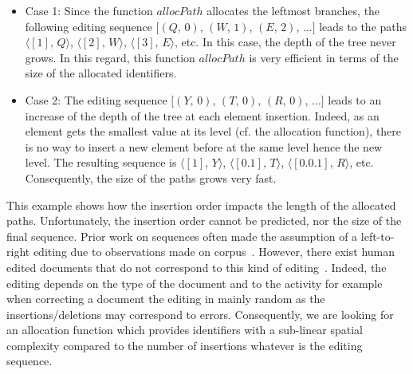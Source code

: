 \begin{itemize}[leftmargin=*]
\item Case 1: Since the function $allocPath$ allocates the leftmost branches,
  the following editing sequence $[(Q,\,0)$, $(W,\,1)$, $(E,\,2)$, $\ldots]$
  leads to the paths $\langle [1],\, Q\rangle$, $\langle [2],\, W\rangle$,
  $\langle [3],\, E\rangle$, etc. In this case, the depth of the tree never
  grows. In this regard, this function $allocPath$ is very efficient in terms
  of the size of the allocated identifiers.

\item Case 2: The editing sequence $[(Y,\,0)$, $(T,\,0)$, $(R,\,0)$, $\ldots]$
  leads to an increase of the depth of the tree at each element
  insertion. Indeed, as an element gets the smallest value at its level
  (cf. the allocation function), there is no way to insert a new element before
  at the same level hence the new level. The resulting sequence is
  $\langle [1],\, Y\rangle$, $\langle [0.1],\, T\rangle$,
  $\langle [0.0.1],\, R \rangle$, etc. Consequently, the size of the paths
  grows very fast.
\end{itemize}

This example shows how the insertion order impacts the length of the allocated
paths. Unfortunately, the insertion order cannot be predicted, nor the size of
the final sequence. Prior work on sequences often made the assumption of a
left-to-right editing due to observations made on
corpus~\cite{preguica2009commutative, weiss2009logoot}. However, there exist
human edited documents that do not correspond to this kind of
editing~\cite{nedelec2013lseq}. Indeed, the editing depends on the type of the
document and to the activity for example when correcting a document the editing
in mainly random as the insertions/deletions may correspond to
errors. Consequently, we are looking for an allocation function which provides
identifiers with a sub-linear spatial complexity compared to the number of
insertions whatever is the editing sequence.

